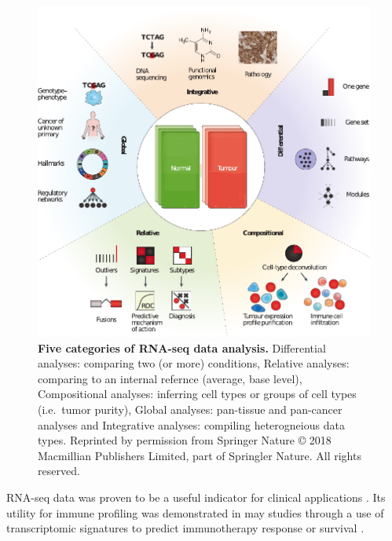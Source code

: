 \documentclass[12pt,]{book}
\theoremstyle{definition}
\theoremstyle{definition}
\theoremstyle{definition}
\theoremstyle{remark}
\begin{document}
\begin{figure}

{\centering \includegraphics[width=1\linewidth]{figures-ext/transcriptome-methods} 

}

\caption[Five categories of RNA-seq data analysis.]{\textbf{Five categories of RNA-seq
data analysis.} Differential analyses: comparing two (or more)
conditions, Relative analyses: comparing to an internal refernce
(average, base level), Compositional analyses: inferring cell types or
groups of cell types (i.e.~tumor purity), Global analyses: pan-tissue
and pan-cancer analyses and Integrative analyses: compiling
heterogneious data types. Reprinted by permission from Springer Nature
\citep{Cieslik2017} © 2018 Macmillian Publishers Limited, part of
Springler Nature. All rights reserved.}\label{fig:transcriptome-methods}
\end{figure}











RNA-seq data was proven to be a useful indicator for clinical
applications \citep{Mody2015, Oberg2016, Robinson2017}. Its utility for
immune profiling was demonstrated in may studies through a use of
transcriptomic signatures to predict immunotherapy response or survival
\citep{Chen2016}.
\end{document}

